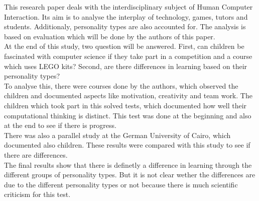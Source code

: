 This research paper deals with the interdisciplinary subject of Human Computer Interaction. Its aim is to analyse the interplay of technology, games, tutors and students. Additionaly, personality types are also accounted for. The analysis is based on evaluation which will be done by the authors of this paper.\\
At the end of this study, two question will be answered. First, can children be fascinated with computer science if they take part in a competition and a course which uses LEGO kits? Second, are there differences in learning based on their personality types?\\
To analyse this, there were courses done by the authors, which observed the children and documented aspects like motivation, creativity and team work. The children which took part in this solved tests, which documented how well their computational thinking is distinct. This test was done at the beginning and also at the end to see if there is progress.\\
There was also a parallel study at the German University of Cairo, which documented also children. These results were compared with this study to see if there are differences.\\
The final results show that there is definetly a difference in learning through the different groups of personality types. But it is not clear wether the differences are due to the different personality types or not because there is much scientific criticism for this test.